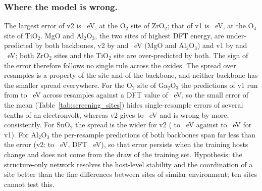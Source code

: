 \subsubsection{Where the model is wrong.}
The largest error of v2 is \numScreeningDemoSummaryVTwoMaxAbsErrEV{}~eV, at the O$_2$ site of ZrO$_2$; that of v1 is \numScreeningDemoSummaryVOneMaxAbsErrEV{}~eV, at the O$_4$ site of TiO$_2$. MgO and Al$_2$O$_3$, the two sites of highest DFT energy, are under-predicted by both backbones, v2 by \numScreeningDemoSitesMgOVaOOneZeroVTwoAbsErrEV{} and \numScreeningDemoSitesAlTwoOThreeVaOOneZeroVTwoAbsErrEV{}~eV (MgO and Al$_2$O$_3$) and v1 by \numScreeningDemoSitesMgOVaOOneZeroVOneAbsErrEV{} and \numScreeningDemoSitesAlTwoOThreeVaOOneZeroVOneAbsErrEV{}~eV; both ZrO$_2$ sites and the TiO$_2$ site are over-predicted by both. The sign of the error therefore follows no single rule across the oxides. The spread over resamples is a property of the site and of the backbone, and neither backbone has the smaller spread everywhere. For the O$_2$ site of Ga$_2$O$_3$ the predictions of v1 run from \numScreeningDemoSitesGaTwoOThreeVaOTwoZeroVOneMinEV{} to \numScreeningDemoSitesGaTwoOThreeVaOTwoZeroVOneMaxEV{}~eV across resamples against a DFT value of \numScreeningDemoSitesGaTwoOThreeVaOTwoZeroDftEV{}~eV, so the small error of the mean (Table~\ref{tab:screening_sites}) hides single-resample errors of several tenths of an electronvolt, whereas v2 gives \numScreeningDemoSitesGaTwoOThreeVaOTwoZeroVTwoMinEV{} to \numScreeningDemoSitesGaTwoOThreeVaOTwoZeroVTwoMaxEV{}~eV and is wrong by more, consistently. For SnO$_2$ the spread is the wider for v2 (\numScreeningDemoSitesSnOTwoVaOOneZeroVTwoMinEV{} to \numScreeningDemoSitesSnOTwoVaOOneZeroVTwoMaxEV{}~eV against \numScreeningDemoSitesSnOTwoVaOOneZeroVOneMinEV{} to \numScreeningDemoSitesSnOTwoVaOOneZeroVOneMaxEV{}~eV for v1). For Al$_2$O$_3$ the per-resample predictions of both backbones span far less than the error (v2: \numScreeningDemoSitesAlTwoOThreeVaOOneZeroVTwoMinEV{} to \numScreeningDemoSitesAlTwoOThreeVaOOneZeroVTwoMaxEV{}~eV, DFT \numScreeningDemoSitesAlTwoOThreeVaOOneZeroDftEV{}~eV), so that error persists when the training hosts change and does not come from the draw of the training set. Hypothesis: the structure-only network resolves the host-level stability and the coordination of a site better than the fine differences between sites of similar environment; ten sites cannot test this.

